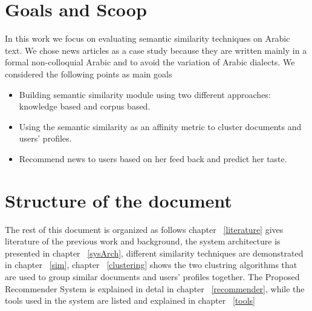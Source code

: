 \section{Goals and Scoop}\label{subsec:goals}
In this work we focus on evaluating semantic similarity techniques on Arabic text. We chose news articles as a case study because they are written mainly in a formal non-colloquial Arabic and to avoid the variation of Arabic dialects.
We considered the following points as main goals
\begin {itemize}
\item Building semantic similarity module using two different approaches: knowledge based and corpus based.
\item Using the semantic similarity as an affinity metric to cluster documents and users' profiles.
\item Recommend news to users based on her feed back and predict her taste.
\end{itemize}

\section{Structure of the document}\label{subsec:struct}
The rest of this document is organized as follows chapter ~\ref{literature} gives literature of the previous work and background, the system architecture is presented in chapter ~\ref{sysArch}, different similarity techniques are demonstrated in chapter ~\ref{sim}, chapter ~\ref{clustering} shows the two clustring algorithms that are used to group similar documents and users' profiles together. The Proposed Recommender System is explained in detal in chapter ~\ref{recommender}, while the tools used in the system are listed and explained in chapter ~\ref{tools}


